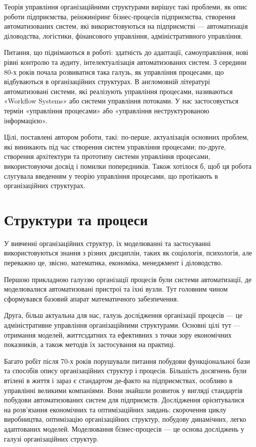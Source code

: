 \documentclass{memoir}
\begin{document}
Теорія управління організаційними структурами вирішує такі проблеми, як опис роботи підприємства, реінжиніринг бізнес-процесів підприємства, створення автоматизованих систем, які використовуються на підприємстві — автоматизація діловодства, логістики, фінансового управління, адміністративного управління.

Питання, що піднімаються в роботі: здатність до адаптації, самоуправління, нові рівні контролю та аудиту, інтелектуалізація автоматизованих систем. З середини 80-х років почала розвиватися така галузь, як управління процесами, що відбуваються в організаційних структурах. В англомовній літературі автоматизовані системи, які реалізують управління процесами, називаються «Workflow Systems» або системи управління потоками. У нас застосовується термін «управління процесами» або «управління неструктурованою інформацією».

Цілі, поставлені автором роботи, такі: по-перше, актуалізація основних проблем, які виникають під час створення систем управління процесами; по-друге, створення архітектури та прототипу системи управління процесами, використовуючи досвід і помилки попередників. Також хотілося б, щоб ця робота слугувала введенням у теорію управління процесами, що протікають в організаційних структурах.

\section{Структури та процеси}

У вивченні організаційних структур, їх моделюванні та застосуванні використовуються знання з різних дисциплін, таких як соціологія, психологія, але переважно це, звісно, математика, економіка, менеджмент і діловодство.

Першою прикладною галуззю організації процесів були системи автоматизації, де моделювалися автоматизовані пристрої та їхні вузли. Тут головним чином сформувався базовий апарат математичного забезпечення.

Друга, більш актуальна для нас, галузь дослідження організації процесів — це адміністративне управління організаційними структурами. Основні цілі тут — отримання моделей, життєздатних та ефективних з точки зору економічних показників, а також методів їх застосування на практиці.

Багато робіт після 70-х років порушували питання побудови функціональної бази та способів опису організаційних структур і процесів. Більшість досягнень були втілені в життя і зараз є стандартом де-факто на підприємствах, особливо в управлінні великими компаніями. Вони знайшли розвиток у вигляді стандартів побудови автоматизованих систем для підприємств. Дослідження орієнтувалися на розв’язання економічних та оптимізаційних завдань: скорочення циклу виробництва, оптимізацію організаційних структур, побудову динамічних, легко адаптованих моделей. Моделювання бізнес-процесів — це основа досліджень у галузі організаційних структур.
\end{document}

